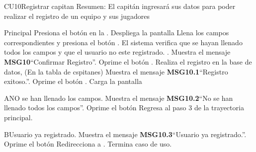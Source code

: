 
\begin{UseCase}{CU10}{Registrar capitan}{
		Resumen: El capitán ingresará sus datos para poder realizar el registro de un equipo y sus jugadores	}
	\end{UseCase}
	\newpage
	\begin{UCtrayectoria}{Principal}
	\UCpaso[\UCactor] Presiona el botón  en la .
	\UCpaso Despliega la pantalla 
	\UCpaso[\UCactor] Llena los campos correspondientes y presiona el botón .
	\UCpaso El sistema verifica que se hayan llenado todos los campos y que el usuario no este registrado.  .
	\UCpaso Muestra el mensaje {\bf MSG10}``Confirmar Registro''.
    \UCpaso[\UCactor] Oprime el botón .
    \UCpaso Realiza el registro en la base de datos, (En la tabla de cspitanes)
	\UCpaso Muestra el mensaje {\bf MSG10.1}``Registro exitoso.''.
	\UCpaso[\UCactor] Oprime el botón .
	\UCpaso Carga la pantalla 
\end{UCtrayectoria}

	\begin{UCtrayectoriaA}{A}{NO se han llenado los campos.}
		\UCpaso Muestra el mensaje {\bf MSG10.2}``No se han llenado todos los campos''.
		\UCpaso[\UCactor] Oprime el botón 
		\UCpaso[] Regresa al paso 3 de la trayectoria principal.
	\end{UCtrayectoriaA}
	
	\begin{UCtrayectoriaA}{B}{Usuario ya registrado.}
		\UCpaso Muestra el mensaje {\bf MSG10.3}``Usuario ya registrado.''.
		\UCpaso[\UCactor] Oprime el botón 
		\UCpaso Redirecciona a .
		\UCpaso[] Termina caso de uso.
	\end{UCtrayectoriaA}
